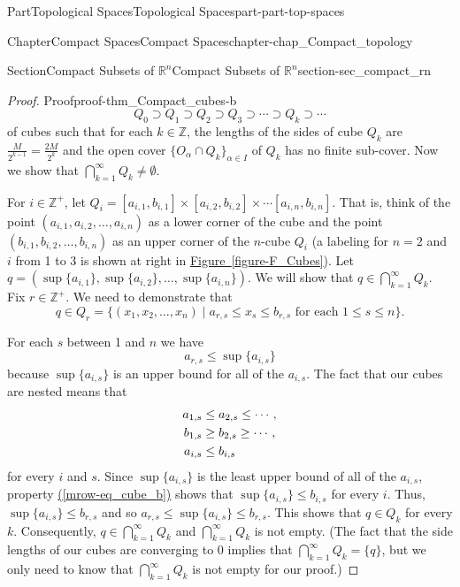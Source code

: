 \documentclass[oneside,10pt,]{book}
\newcommand{\xreffont}{\relax}
\numberwithin{equation}{chapter}
\newcommand{\Z}{\mathbb{Z}}
\newcommand{\R}{\mathbb{R}}
\newcommand{\amp}{&}
\begin{document}
\begin{partptx}{Part}{Topological Spaces}{}{Topological Spaces}{}{}{part-part-top-spaces}
\begin{chapterptx}{Chapter}{Compact Spaces}{}{Compact Spaces}{}{}{chapter-chap_Compact_topology}
\begin{sectionptx}{Section}{Compact Subsets of \(\R^n\)}{}{Compact Subsets of \(\R^n\)}{}{}{section-sec_compact_rn}
\begin{proof}{Proof}{}{proof-thm_Compact_cubes-b}
\begin{equation*}
Q_0 \supset Q_1 \supset Q_2 \supset Q_3 \supset \cdots \supset Q_k \supset \cdots
\end{equation*}
of cubes such that for each \(k \in \Z\), the lengths of the sides of cube \(Q_k\) are \(\frac{M}{2^{k-1}} = \frac{2M}{2^{k}}\) and the open cover \(\{O_{\alpha} \cap Q_k\}_{\alpha \in I}\) of \(Q_k\) has no finite sub-cover. Now we show that \(\bigcap_{k=1}^{\infty} Q_k \neq \emptyset\).%
\par
For \(i \in \Z^+\), let \(Q_i = [a_{i,1}, b_{i,1}] \times [a_{i,2}, b_{i,2}] \times \cdots [a_{i,n}, b_{i,n}]\). That is, think of the point \((a_{i,1}, a_{i,2}, \ldots,
a_{i,n})\) as a lower corner of the cube and the point \((b_{i,1}, b_{i,2}, \ldots,
b_{i,n})\) as an upper corner of the \(n\)-cube \(Q_i\) (a labeling for \(n=2\) and \(i\) from 1 to 3 is shown at right in \hyperref[figure-F_Cubes]{Figure~{\xreffont\ref{figure-F_Cubes}}}). Let \(q = (\sup\{a_{i,1}\}, \sup\{a_{i,2}\}, \ldots, \sup\{a_{i,n}\})\). We will show that \(q \in \bigcap_{k=1}^{\infty} Q_k\). Fix \(r \in \Z^+\). We need to demonstrate that%
\begin{equation*}
q \in Q_r = \{(x_1, x_2, \ldots, x_n) \mid a_{r,s} \leq x_s \leq b_{r,s} \text{ for each }  1 \leq s \leq n\}\text{.}
\end{equation*}
%
\par
For each \(s\) between 1 and \(n\) we have%
\begin{equation}
a_{r,s} \leq \sup\{a_{i,s}\}\label{men-eq_cube_a}
\end{equation}
because \(\sup\{a_{i,s}\}\) is an upper bound for all of the \(a_{i,s}\). The fact that our cubes are nested means that%
\begin{align}
a_{1,s} \amp \leq a_{2,s} \leq \cdots,\notag\\
b_{1,s} \amp \geq b_{2,s} \geq \cdots,\notag\\
a_{i,s} \amp \leq b_{i,s}\label{mrow-eq_cube_b}
\end{align}
for every \(i\) and \(s\). Since \(\sup\{a_{i,s}\}\) is the least upper bound of all of the \(a_{i,s}\), property \hyperref[mrow-eq_cube_b]{({\xreffont\ref{mrow-eq_cube_b}})} shows that \(\sup\{a_{i,s}\} \leq b_{i,s}\) for every \(i\). Thus, \(\sup\{a_{i,s}\} \leq b_{r,s}\) and so \(a_{r,s} \leq \sup\{a_{i,s}\} \leq b_{r,s}\). This shows that \(q \in Q_k\) for every \(k\). Consequently, \(q \in \bigcap_{k=1}^{\infty} Q_k\) and \(\bigcap_{k=1}^{\infty} Q_k\) is not empty. (The fact that the side lengths of our cubes are converging to 0 implies that \(\bigcap_{k=1}^{\infty} Q_k = \{q\}\), but we only need to know that \(\bigcap_{k=1}^{\infty} Q_k\) is not empty for our proof.)%

\end{proof}
\end{sectionptx}
\end{chapterptx}
\end{partptx}
\end{document}
